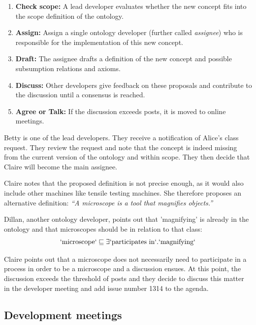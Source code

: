 \begin{enumerate}
    \item \textbf{Check scope: } A lead developer evaluates whether the new concept fits into the scope definition of the ontology.
    \item \textbf{Assign:} Assign a single ontology developer (further called \textit{assignee}) who is responsible for the implementation of this new concept.
    \item \textbf{Draft:} The assignee drafts a definition of the new concept and possible subsumption relations and axioms.
    \item \textbf{Discuss:} Other developers give feedback on these proposals and contribute to the discussion until a consensus is reached.
    \item \textbf{Agree or Talk:} If the discussion exceeds {\issuediscussionlimit} posts, it is moved to online meetings.
\end{enumerate}

\begin{example}
    Betty is one of the lead developers. They receive a notification of Alice's class request. They review the request and note that the concept is indeed missing from the current version of the ontology and within scope. They then decide that Claire will become the main assignee.

    Claire notes that the proposed definition is not precise enough, as it would also include other machines like tensile testing machines. She therefore proposes an alternative definition: \textit{``A microscope is a tool that magnifies objects.''}

    Dillan, another ontology developer, points out that 'magnifying' is already in the ontology and that microscopes should be in relation to that class: 
    \[\mathrm{`microscope`} \sqsubseteq \exists \mathrm{`participates~in`}.\mathrm{`magnifying`}\]

    Claire points out that a microscope does not necessarily need to participate in a process in order to be a microscope and a discussion ensues. At this point, the discussion exceeds the threshold of {\issuediscussionlimit} posts and they decide to discuss this matter in the developer meeting and add issue number 1314 to the agenda.
\end{example}

\subsection{Development meetings}

